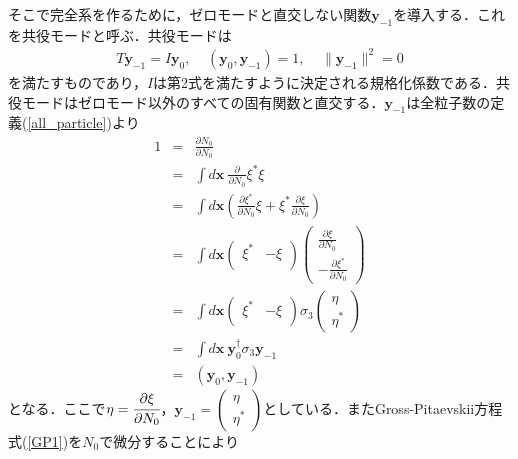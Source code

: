 \documentclass[10.5pt,a4paper]{jreport}
\begin{document}
そこで完全系を作るために，ゼロモードと直交しない関数$\bm{y}_{-1}$を導入する．これを共役モードと呼ぶ．共役モードは
\begin{eqnarray}
  T\bm{y}_{-1} = I\bm{y}_0,\ \ \ \ \ (\bm{y}_0, \bm{y}_{-1})=1,\ \ \ \ \ \parallel \bm{y}_{-1}\parallel^2=0
\end{eqnarray}
を満たすものであり，$I$は第2式を満たすように決定される規格化係数である．共役モードはゼロモード以外のすべての固有関数と直交する．$\bm{y}_{-1}$は全粒子数の定義(\ref{all_particle})より%
\begin{eqnarray}
  \nonumber 1&=& \frac{\partial N_0}{\partial N_0}\\
  \nonumber&=& \int d\bm{x}\  \frac{\partial}{\partial N_0}\xi^*\xi\\
  \nonumber&=& \int d\bm{x} \left(\frac{\partial\xi^*}{\partial N_0}\xi + \xi^*\frac{\partial \xi}{\partial N_0}\right)\\
  \nonumber&=& \int d\bm{x}
  \begin{pmatrix}
    \xi^* & -\xi \\
  \end{pmatrix}
  \begin{pmatrix}
    \frac{\partial\xi}{\partial N_0} \\
    -\frac{\partial\xi^*}{\partial N_0}
  \end{pmatrix}\\
  \nonumber&=&\int d \bm{x}
  \begin{pmatrix}
    \xi^* & -\xi \\
  \end{pmatrix}
  \sigma_3
  \begin{pmatrix}
    \eta \\
    \eta^*
  \end{pmatrix}\\
  \nonumber&=& \int d \bm{x}\  \bm{y}^\dagger_0\sigma_3\bm{y}_{-1}\\
  &=&(\bm{y}_0, \bm{y}_{-1})
\end{eqnarray}
となる．ここで$\eta=\cfrac{\partial\xi}{\partial N_0}$，$\bm{y}_{-1} = 
\begin{pmatrix}
  \eta \\
  \eta^*
\end{pmatrix}$としている．またGross-Pitaevskii方程式(\ref{GP1})を$N_0$で微分することにより
\end{document}
